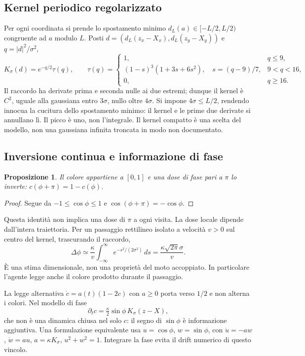 \documentclass[11pt,a4paper]{article}
\newtheorem{proposition}{Proposizione}
\begin{document}
\subsection{Kernel periodico regolarizzato}
Per ogni coordinata si prende lo spostamento minimo
$d_L(a)\in[-L/2,L/2)$ congruente ad $a$ modulo $L$.
Posti $d=(d_L(z_x-X_x),d_L(z_y-X_y))$ e $q=|d|^2/\sigma^2$,
\begin{equation}
 K_\sigma(d)=e^{-q/2}\tau(q),\qquad
 \tau(q)=\begin{cases}
 1,&q\le9,\\
 (1-s)^3(1+3s+6s^2),\quad s=(q-9)/7,&9<q<16,\\
 0,&q\ge16.
 \end{cases}
\end{equation}
Il raccordo ha derivate prima e seconda nulle ai due estremi; dunque il
kernel è $C^2$, uguale alla gaussiana entro $3\sigma$, nullo oltre $4\sigma$.
Si impone $4\sigma\le L/2$, rendendo innocua la cucitura dello spostamento
minimo: il kernel e le prime due derivate si annullano lì.
Il picco è uno, non l'integrale. Il kernel compatto è una scelta del modello,
non una gaussiana infinita troncata in modo non documentato.

\subsection{Inversione continua e informazione di fase}
\begin{proposition}
Il colore appartiene a $[0,1]$ e una dose di fase pari a $\pi$ lo inverte:
$c(\phi+\pi)=1-c(\phi)$.
\end{proposition}
\begin{proof}
Segue da $-1\le\cos\phi\le1$ e $\cos(\phi+\pi)=-\cos\phi$.
\end{proof}
Questa identità non implica una dose di $\pi$ a ogni visita. La dose locale
dipende dall'intera traiettoria. Per un passaggio rettilineo isolato a velocità
$v>0$ sul centro del kernel, trascurando il raccordo,
\begin{equation}
 \Delta\phi\simeq\frac{\kappa}{v}
       \int_{-\infty}^{\infty}e^{-s^2/(2\sigma^2)}\,ds
 =\frac{\kappa\sqrt{2\pi}\sigma}{v}.
\end{equation}
È una stima dimensionale, non una proprietà del moto accoppiato.
In particolare l'agente legge anche il colore prodotto durante il passaggio.

La legge alternativa $\dot c=a(t)(1-2c)$ con $a\ge0$ porta verso $1/2$
e non alterna i colori. Nel modello di fase
\begin{equation}
 \partial_t c=\tfrac\kappa2\sin\phi\,K_\sigma(z-X),
\end{equation}
che non è una dinamica chiusa nel solo $c$: il segno di $\sin\phi$ è
informazione aggiuntiva. Una formulazione equivalente usa $u=\cos\phi$,
$w=\sin\phi$, con $\dot u=-a w$, $\dot w=a u$, $a=\kappa K_\sigma$,
$u^2+w^2=1$. Integrare la fase evita il drift numerico di questo vincolo.
\end{document}
